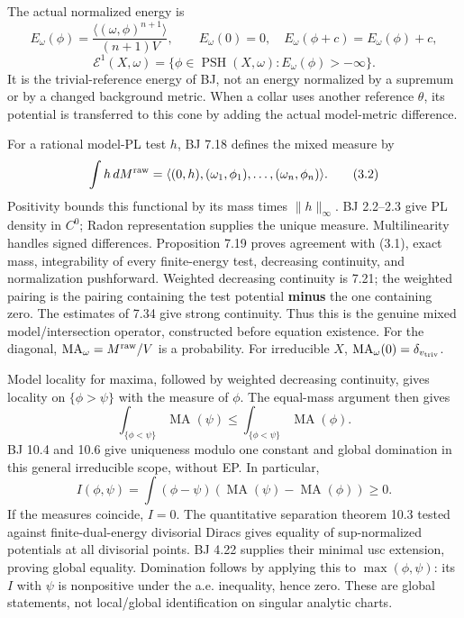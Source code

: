 \documentclass[
  10pt,
]{article}
\begin{document}
The actual normalized energy is
\[E_\omega(\phi)=\frac{\langle(\omega,\phi)^{n+1}\rangle}{(n+1)V},\qquad
 E_\omega(0)=0,\quad E_\omega(\phi+c)=E_\omega(\phi)+c,\]
\[\mathcal E^1(X,\omega)=\{\phi\in\operatorname{PSH}(X,\omega):E_\omega(\phi)>-\infty\}.\]
It is the trivial-reference energy of BJ, not an energy normalized by a
supremum or by a changed background metric. When a collar uses another
reference \(\theta\), its potential is transferred to this cone by
adding the actual model-metric difference.

For a rational model-PL test \(h\), BJ 7.18 defines the mixed measure by
\[\int h\,dM^{\rm raw}
 =\langle(0,h),(\omega_1,\phi_1),\ldots,(\omega_n,\phi_n)\rangle.\tag{3.2}\]
Positivity bounds this functional by its mass times \(\|h\|_\infty\). BJ
2.2--2.3 give PL density in \(C^0\); Radon representation supplies the
unique measure. Multilinearity handles signed differences. Proposition
7.19 proves agreement with (3.1), exact mass, integrability of every
finite-energy test, decreasing continuity, and normalization
pushforward. Weighted decreasing continuity is 7.21; the weighted
pairing is the pairing containing the test potential \textbf{minus} the
one containing zero. The estimates of 7.34 give strong continuity. Thus
this is the genuine mixed model/intersection operator, constructed
before equation existence. For the diagonal,
\(\operatorname{MA}_\omega=M^{\rm raw}/V\) is a probability. For
irreducible \(X\),
\(\operatorname{MA}_\omega(0)=\delta_{v_{\rm triv}}\).

Model locality for maxima, followed by weighted decreasing continuity,
gives locality on \(\{\phi>\psi\}\) with the measure of \(\phi\). The
equal-mass argument then gives
\[\int_{\{\phi<\psi\}}\operatorname{MA}(\psi)
   \le\int_{\{\phi<\psi\}}\operatorname{MA}(\phi).\] BJ 10.4 and 10.6
give uniqueness modulo one constant and global domination in this
general irreducible scope, without EP. In particular,
\[I(\phi,\psi)=\int(\phi-\psi)(\operatorname{MA}(\psi)-\operatorname{MA}(\phi))\ge0.\]
If the measures coincide, \(I=0\). The quantitative separation theorem
10.3 tested against finite-dual-energy divisorial Diracs gives equality
of sup-normalized potentials at all divisorial points. BJ 4.22 supplies
their minimal usc extension, proving global equality. Domination follows
by applying this to \(\max(\phi,\psi)\): its \(I\) with \(\psi\) is
nonpositive under the a.e. inequality, hence zero. These are global
statements, not local/global identification on singular analytic charts.
\end{document}
